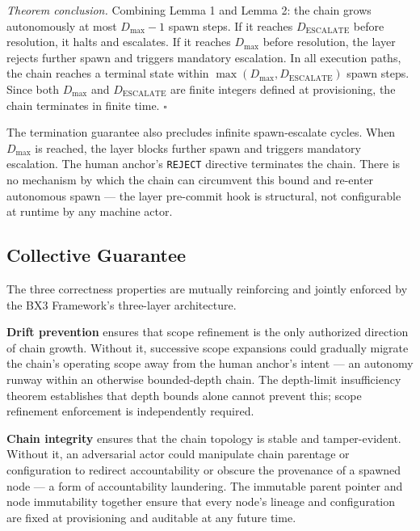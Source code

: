 \medskip
\textit{Theorem conclusion.} Combining Lemma 1 and Lemma 2: the chain grows autonomously at most $D_{\mathrm{max}} - 1$ spawn steps. If it reaches $D_{\mathrm{ESCALATE}}$ before resolution, it halts and escalates. If it reaches $D_{\mathrm{max}}$ before resolution, the \fact{} layer rejects further spawn and triggers mandatory escalation. In all execution paths, the chain reaches a terminal state within $\max(D_{\mathrm{max}}, D_{\mathrm{ESCALATE}})$ spawn steps. Since both $D_{\mathrm{max}}$ and $D_{\mathrm{ESCALATE}}$ are finite integers defined at provisioning, the chain terminates in finite time. $\square$

The termination guarantee also precludes infinite spawn-escalate cycles. When $D_{\mathrm{max}}$ is reached, the \fact{} layer blocks further spawn and triggers mandatory escalation. The human anchor's \texttt{REJECT} directive terminates the chain. There is no mechanism by which the chain can circumvent this bound and re-enter autonomous spawn --- the \fact{} layer pre-commit hook is structural, not configurable at runtime by any machine actor.

\subsection{Collective Guarantee}
\label{sec:rs-collective}

The three correctness properties are mutually reinforcing and jointly enforced by the BX3 Framework's three-layer architecture.

\medskip
\textbf{Drift prevention} ensures that scope refinement is the only authorized direction of chain growth. Without it, successive scope expansions could gradually migrate the chain's operating scope away from the human anchor's intent --- an autonomy runway within an otherwise bounded-depth chain. The depth-limit insufficiency theorem establishes that depth bounds alone cannot prevent this; scope refinement enforcement is independently required.

\medskip
\textbf{Chain integrity} ensures that the chain topology is stable and tamper-evident. Without it, an adversarial actor could manipulate chain parentage or configuration to redirect accountability or obscure the provenance of a spawned node --- a form of accountability laundering. The immutable parent pointer and node immutability together ensure that every node's lineage and configuration are fixed at provisioning and auditable at any future time.

